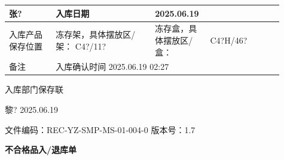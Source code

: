 \documentclass[UTF8,10pt,a4paper,fontset=fandol]{ctexart}
\newcommand{\fieldvalue}[1]{#1}
\newcommand{\handwritten}[1]{#1}
\begin{document}
\begin{tabular}{|p{0.16\linewidth}|p{0.34\linewidth}|p{0.16\linewidth}|p{0.25\linewidth}|}
\fieldvalue{\handwritten{张?}} &
入库日期 &
\fieldvalue{\handwritten{2025.06.19}} \\ \hline
\multicolumn{1}{|l|}{入库产品保存位置} &
\multicolumn{1}{l|}{冻存架，具体摆放区/架：
\fieldvalue{\handwritten{C4?/11?}}} &
\multicolumn{1}{l|}{冻存盒，具体摆放区/盒：} &
\fieldvalue{\handwritten{C4?H/46?}} \\ \hline
备注 &
\multicolumn{3}{l|}{
\fieldvalue{\handwritten{入库确认时间 2025.06.19 02:27}}} \\ \hline
\end{tabular}

\vspace{0.2cm}
\begin{flushright}
入库部门保存联
\end{flushright}

\handwritten{黎? 2025.06.19}

\vspace{1cm}
\hrulefill

\noindent
文件编码：REC-YZ-SMP-MS-01-004-0 \hfill 版本号：1.7

\begin{center}
\textbf{不合格品入/退库单}
\end{center}
\end{document}
